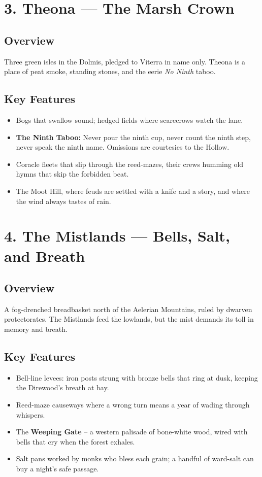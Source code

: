 \documentclass[11pt]{article}
\begin{document}
\section*{3. Theona --- The Marsh Crown}

\subsection*{Overview}
Three green isles in the Dolmis, pledged to Viterra in name only. Theona is a place of peat smoke, standing stones, and the eerie \textit{No Ninth} taboo.

\subsection*{Key Features}
\begin{itemize}[leftmargin=*]
    \item Bogs that swallow sound; hedged fields where scarecrows watch the lane.
    \item \textbf{The Ninth Taboo:} Never pour the ninth cup, never count the ninth step, never speak the ninth name. Omissions are courtesies to the Hollow.
    \item Coracle fleets that slip through the reed-mazes, their crews humming old hymns that skip the forbidden beat.
    \item The Moot Hill, where feuds are settled with a knife and a story, and where the wind always tastes of rain.
\end{itemize}

\section*{4. The Mistlands --- Bells, Salt, and Breath}

\subsection*{Overview}
A fog-drenched breadbasket north of the Aelerian Mountains, ruled by dwarven protectorates. The Mistlands feed the lowlands, but the mist demands its toll in memory and breath.

\subsection*{Key Features}
\begin{itemize}[leftmargin=*]
    \item Bell-line levees: iron posts strung with bronze bells that ring at dusk, keeping the Direwood's breath at bay.
    \item Reed-maze causeways where a wrong turn means a year of wading through whispers.
    \item The \textbf{Weeping Gate} -- a western palisade of bone-white wood, wired with bells that cry when the forest exhales.
    \item Salt pans worked by monks who bless each grain; a handful of ward-salt can buy a night's safe passage.
\end{itemize}
\end{document}
